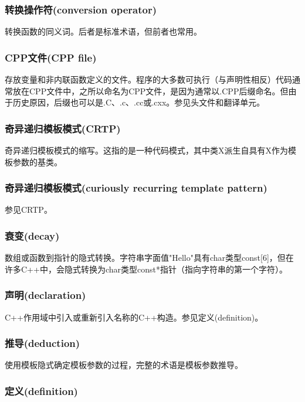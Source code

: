 \subsubsection{转换操作符(conversion operator)}

转换函数的同义词。后者是标准术语，但前者也常用。

\subsubsection{CPP文件(CPP file)}

存放变量和非内联函数定义的文件。程序的大多数可执行（与声明性相反）代码通常放在CPP文件中，之所以命名为CPP文件，是因为通常以.CPP后缀命名。但由于历史原因，后缀也可以是.C、.c、.cc或.cxx。参见头文件和翻译单元。

\subsubsection{奇异递归模板模式(CRTP)}

奇异递归模板模式的缩写。这指的是一种代码模式，其中类X派生自具有X作为模板参数的基类。

\subsubsection{奇异递归模板模式(curiously recurring template pattern)}

参见CRTP。

\subsubsection{衰变(decay)}

数组或函数到指针的隐式转换。字符串字面值"Hello"具有char类型const[6]，但在许多C++中，会隐式转换为char类型const*指针（指向字符串的第一个字符）。

\subsubsection{声明(declaration)}

C++作用域中引入或重新引入名称的C++构造。参见定义(definition)。

\subsubsection{推导(deduction)}

使用模板隐式确定模板参数的过程，完整的术语是模板参数推导。

\subsubsection{定义(definition)}

